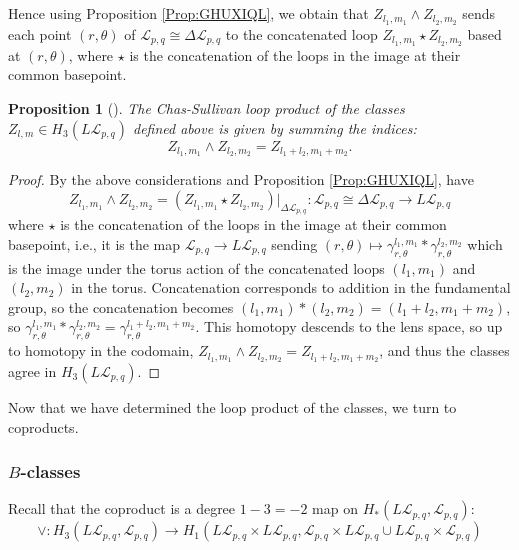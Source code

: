 \documentclass[reqno]{amsart}
\newtheorem{proposition}[theorem]{Proposition}
\theoremstyle{definition}
\theoremstyle{remark}
\begin{document}
Hence using Proposition \ref{Prop:GHUXIQL}, we obtain
that $Z_{l_1, m_1} \wedge
Z_{l_2, m_2}$ sends each point $\left( r, \theta \right) $
of $\mathcal{L}_{p,q} \cong \Delta
\mathcal{L}_{p,q}$ to the concatenated loop
$Z_{l_1,m_1} \star Z_{l_2,m_2}$ based at
$(r, \theta)$,
where $\star$ is the concatenation of the loops in the image
at their common basepoint.

\begin{proposition}[]
    The Chas-Sullivan loop product of the classes
    $Z_{l,m} \in H_3 \left( L \mathcal{L}_{p,q} \right) $ defined
    above is given by summing the indices:
    \[
    Z_{l_1,m_1} \wedge Z_{l_2,m_2} = 
    Z_{l_1+l_2 , m_1+m_2}.
    \] 
\end{proposition}

\begin{proof}
    By the above considerations and
    Proposition \ref{Prop:GHUXIQL}, have
    \[
    Z_{l_1,m_1} \wedge
    Z_{l_2,m_2}  
    = \left( Z_{l_1,m_1}\star Z_{l_2,m_2} \right) |_{\Delta \mathcal{L}_{p,q}}
    \colon \mathcal{L}_{p,q} \cong
    \Delta \mathcal{L}_{p,q} \to L \mathcal{L}_{p,q}
    \] 
    where $\star$ is the concatenation of the loops in the image
    at their common basepoint, i.e.,
    it is the map
    $\mathcal{L}_{p,q} \to L \mathcal{L}_{p,q}$ sending
    $\left( r, \theta \right) \mapsto 
    \gamma_{r, \theta}^{l_1, m_1} * \gamma_{r, \theta}^{l_2, m_2}$ which
    is the image under the torus action of the
    concatenated loops
    $\left( l_1,m_1 \right) $ and $\left( l_2,m_2 \right) $ in the
    torus. Concatenation corresponds to addition
    in the fundamental group, so the
    concatenation becomes
    $\left( l_1,m_1 \right) * \left( l_2,m_2 \right) =
    \left( l_1+l_2, m_1+m_2 \right) $, so 
    $\gamma_{r,\theta}^{l_1,m_1} * \gamma_{r,\theta}^{l_2, m_2} =
    \gamma_{r, \theta}^{l_1+l_2, m_1+m_2}$.
    This homotopy descends to the lens space, so
    up to homotopy in the codomain,
    $Z_{l_1,m_1} \wedge Z_{l_2,m_2} = 
    Z_{l_1+l_2, m_1+m_2}$, and thus the classes
    agree in $H_{3} \left( L \mathcal{L}_{p,q} \right) $.
\end{proof}


Now that we have determined the loop product of the
classes, we turn to coproducts.

\subsubsection{$B$-classes}


Recall that the coproduct is a degree $1-3 = -2$ map on
$H_* (L \mathcal{L}_{p,q}, \mathcal{L}_{p,q})$:
\[
\vee \colon H_3 \left( L \mathcal{L}_{p,q}, \mathcal{L}_{p,q} \right) 
\to H_1 \left( L \mathcal{L}_{p,q} \times L \mathcal{L}_{p,q},
\mathcal{L}_{p,q} \times L \mathcal{L}_{p,q} \cup 
L \mathcal{L}_{p,q} \times \mathcal{L}_{p,q} \right) 
\] 
\end{document}
